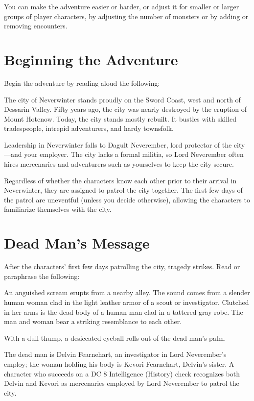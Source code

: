 \documentclass[10pt,a4paper,twoside,fancy,bg=print,twocolumn,openany,nodeprecatedcode]{dndbook}
\begin{document}
You can make the adventure easier or harder, or adjust it for smaller or larger groups of player characters, by adjusting the number of monsters or by adding or removing encounters.

\section{Beginning the Adventure}
Begin the adventure by reading aloud the following:

\begin{DndReadAloud}{}
The city of Neverwinter stands proudly on the Sword Coast, west and north of Dessarin Valley. Fifty years ago, the city was nearly destroyed by the eruption of Mount Hotenow. Today, the city stands mostly rebuilt. It bustles with skilled tradespeople, intrepid adventurers, and hardy townsfolk.

Leadership in Neverwinter falls to Dagult Neverember, lord protector of the city—and your employer. The city lacks a formal militia, so Lord Neverember often hires mercenaries and adventurers such as yourselves to keep the city secure.

\end{DndReadAloud}

Regardless of whether the characters know each other prior to their arrival in Neverwinter, they are assigned to patrol the city together. The first few days of the patrol are uneventful (unless you decide otherwise), allowing the characters to familiarize themselves with the city.

\section{Dead Man's Message}
After the characters' first few days patrolling the city, tragedy strikes. Read or paraphrase the following:

\begin{DndReadAloud}{}
An anguished scream erupts from a nearby alley. The sound comes from a slender human woman clad in the light leather armor of a scout or investigator. Clutched in her arms is the dead body of a human man clad in a tattered gray robe. The man and woman bear a striking resemblance to each other.

With a dull thump, a desiccated eyeball rolls out of the dead man's palm.

\end{DndReadAloud}

The dead man is Delvin Fearnehart, an investigator in Lord Neverember's employ; the woman holding his body is Kevori Fearnehart, Delvin's sister. A character who succeeds on a DC 8 Intelligence (History) check recognizes both Delvin and Kevori as mercenaries employed by Lord Neverember to patrol the city.
\end{document}
